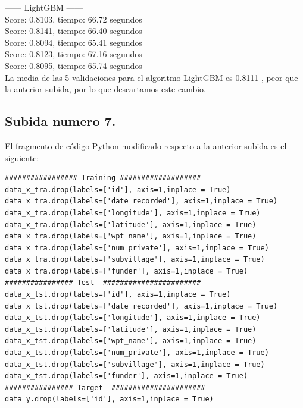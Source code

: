 	------ LightGBM ------\\
	Score: 0.8103, tiempo:  66.72 segundos\\
	Score: 0.8141, tiempo:  66.40 segundos\\
	Score: 0.8094, tiempo:  65.41 segundos\\
	Score: 0.8123, tiempo:  67.16 segundos\\
	Score: 0.8095, tiempo:  65.74 segundos\\
	
	La media de las 5 validaciones para el algoritmo LightGBM es 0.8111 , peor que la anterior subida, por lo 
	que descartamos este cambio.  \\

	
	\subsection[Subida numero 7]{Subida numero 7.}
	
	El fragmento de código Python modificado respecto a la anterior subida es el siguiente:
	
	\lstset{language=python}
	\begin{lstlisting}[frame=single]
################# Training ###################
data_x_tra.drop(labels=['id'], axis=1,inplace = True)
data_x_tra.drop(labels=['date_recorded'], axis=1,inplace = True)
data_x_tra.drop(labels=['longitude'], axis=1,inplace = True)
data_x_tra.drop(labels=['latitude'], axis=1,inplace = True)
data_x_tra.drop(labels=['wpt_name'], axis=1,inplace = True)
data_x_tra.drop(labels=['num_private'], axis=1,inplace = True)
data_x_tra.drop(labels=['subvillage'], axis=1,inplace = True)
data_x_tra.drop(labels=['funder'], axis=1,inplace = True)
################ Test  #######################
data_x_tst.drop(labels=['id'], axis=1,inplace = True)
data_x_tst.drop(labels=['date_recorded'], axis=1,inplace = True)
data_x_tst.drop(labels=['longitude'], axis=1,inplace = True)
data_x_tst.drop(labels=['latitude'], axis=1,inplace = True)
data_x_tst.drop(labels=['wpt_name'], axis=1,inplace = True)
data_x_tst.drop(labels=['num_private'], axis=1,inplace = True)
data_x_tst.drop(labels=['subvillage'], axis=1,inplace = True)
data_x_tst.drop(labels=['funder'], axis=1,inplace = True)
################ Target  ######################
data_y.drop(labels=['id'], axis=1,inplace = True)
	\end{lstlisting}
	
